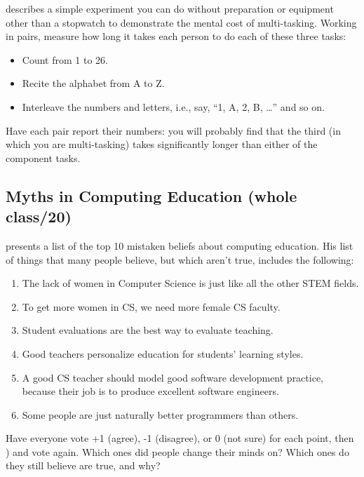 describes a simple experiment you can do without preparation or
equipment other than a stopwatch to demonstrate the mental cost of
multi-tasking. Working in pairs, measure how long it takes each person
to do each of these three tasks:

\begin{itemize}
\item
  Count from 1 to 26.
\item
  Recite the alphabet from A to Z.
\item
  Interleave the numbers and letters, i.e., say, ``1, A, 2, B,
  {\ldots}'' and so on.
\end{itemize}

Have each pair report their numbers: you will probably find that the
third (in which you are multi-tasking) takes significantly longer than
either of the component tasks.

\subsection*{Myths in Computing Education (whole class/20)}

\cite{Guzd2015b} presents a list of the top 10 mistaken beliefs
about computing education. His list of things that many people
believe, but which aren't true, includes the following:

\begin{enumerate}
\item
  The lack of women in Computer Science is just like all the other
  STEM fields.
\item
  To get more women in CS, we need more female CS faculty.
\item
  Student evaluations are the best way to evaluate teaching.
\item
  Good teachers personalize education for students' learning styles.
\item
  A good CS teacher should model good software development practice,
  because their job is to produce excellent software engineers.
\item
  Some people are just naturally better programmers than others.
\end{enumerate}

Have everyone vote +1 (agree), -1 (disagree), or 0 (not sure) for each
point, then ) and vote again. Which ones did people change
their minds on? Which ones do they still believe are true, and why?

